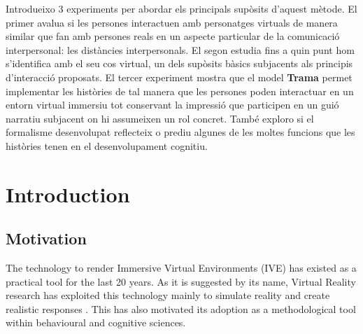 \documentclass[
		twoside,openright,titlepage,numbers=noenddot,manychapters,
		headinclude,%
                footinclude=false,cleardoublepage=empty,
                BCOR=5mm,
		fontsize=11pt, %
                 enabledeprecatedfontcommands]{scrreprt}
\begin{document}
Introdueixo 3 experiments per abordar els principals supòsits d'aquest mètode. El primer avalua si  les persones interactuen amb personatges virtuals de manera similar que fan amb persones reals en un aspecte particular de la comunicació interpersonal: les distàncies interpersonals. El segon estudia fins a quin punt hom s'identifica amb el seu cos virtual, un dels supòsits bàsics subjacents als principis d'interacció proposats.
El tercer experiment mostra que el model \textbf{Trama} permet implementar les històries de tal manera que les persones poden interactuar en un entorn virtual immersiu tot conservant la impressió que participen en un guió narratiu subjacent on hi assumeixen un rol concret.
També exploro si el formalisme desenvolupat reflecteix o prediu algunes de les moltes funcions que les històries tenen en el desenvolupament cognitiu.
\cleardoublepage







\setcounter{tocdepth}{1}


\tableofcontents


\cleardoublepage







\chapter{Introduction}
\label{ch_intro}

\section{Motivation}
\thispagestyle{empty}
The technology to render Immersive Virtual Environments (IVE) has existed as a practical tool for the last 20 years. As it is suggested by its name, Virtual Reality research has exploited this technology mainly to simulate reality and create realistic responses \cite[]{brooksJr1999}. This has also motivated its adoption as a methodological tool within behavioural and cognitive sciences.
  
\end{document}
